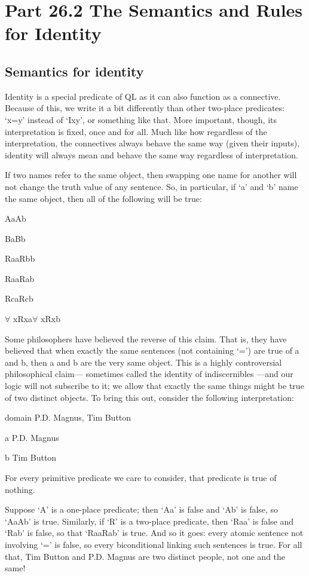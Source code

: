 \section{Part 26.2 The Semantics and Rules for Identity}
\subsection{Semantics for identity}

Identity is a special predicate of QL as it can also function as a connective. Because of this, we write it a bit differently than other two-place predicates: ‘x=y’ instead of ‘Ixy’, or something like that. More important, though, its interpretation is fixed, once and for all. Much like how regardless of the interpretation, the connectives always behave the same way (given their inputs), identity will always mean and behave the same way regardless of interpretation.

If two names refer to the same object, then swapping one name for another will not change the truth value of any sentence. So, in particular, if ‘a’ and ‘b’ name the same object, then all of the following will be true:
\begin{earg}
\item[]Aa\eiff Ab
\item[]Ba\eiff Bb
\item[]Raa\eiff Rbb
\item[]Raa\eiff Rab
\item[]Rca\eiff Rcb
\item[]$\forall$ xRxa\eiff $\forall$ xRxb
\end{earg}
Some philosophers have believed the reverse of this claim. That is, they have believed that when exactly the same sentences (not containing ‘=’) are true of a and b, then a and b are the very same object. This is a highly controversial philosophical claim— sometimes called the identity of indiscernibles —and our logic will not subscribe to it; we allow that exactly the same things might be true of two distinct objects. To bring this out, consider the following interpretation:
\begin{ekey}
\item[domain] P.D. Magnus, Tim Button
\item[a] P.D. Magnus
\item[b] Tim Button
\item[\textbullet] For every primitive predicate we care to consider, that predicate is true of nothing.
\end{ekey}
Suppose ‘A’ is a one-place predicate; then ‘Aa’ is false and ‘Ab’ is false, so ‘Aa\eiff Ab’ is true. Similarly, if ‘R’ is a two-place predicate, then ‘Raa’ is false and ‘Rab’ is false, so that ‘Raa\eiff Rab’ is true. And so it goes: every atomic sentence not involving ‘=’ is false, so every biconditional linking such sentences is true. For all that, Tim Button and P.D. Magnus are two distinct people, not one and the same!

